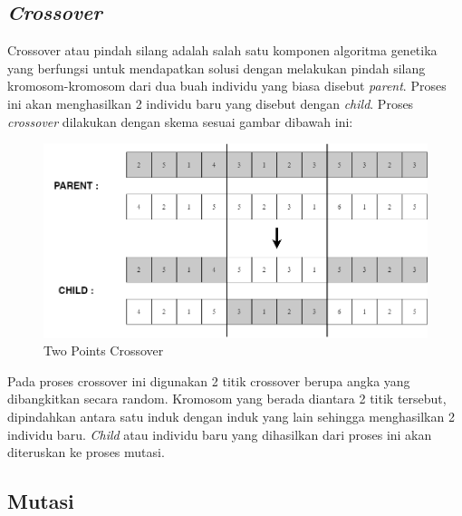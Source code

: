 \subsection{\emph{Crossover}}
  
Crossover atau pindah silang adalah salah satu komponen algoritma genetika yang \linebreak berfungsi untuk mendapatkan solusi dengan melakukan pindah silang kromosom-kromosom dari dua buah individu yang biasa disebut \emph{parent}. 
Proses ini akan menghasilkan 2 individu baru yang disebut dengan \emph{child}. Proses \emph{crossover} dilakukan dengan skema sesuai gambar dibawah ini:


\begin{figure} [ht] \centering
  \includegraphics[scale=0.4]{gambar/cross.png}
  \caption{Two Points Crossover}
  \label{fig:cross}
\end{figure}

Pada proses crossover ini digunakan 2 titik crossover berupa angka yang dibangkitkan secara random.
Kromosom yang berada diantara 2 titik tersebut, dipindahkan antara satu induk dengan induk yang lain sehingga menghasilkan 2 individu baru.
\emph{Child} atau individu baru yang dihasilkan dari proses ini akan diteruskan ke proses mutasi.

\subsection{Mutasi}
  
